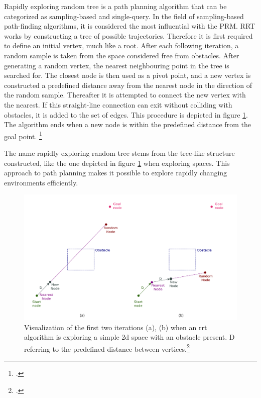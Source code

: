 Rapidly exploring random tree is a path planning algorithm that can be categorized as sampling-based and single-query. In the field of sampling-based path-finding algorithms, it is considered the most influential with the PRM. RRT works by constructing a tree of possible trajectories. Therefore it is first required to define an initial vertex, much like a root. After each following iteration, a random sample is taken from the space considered free from obstacles. After generating a random vertex, the nearest neighbouring point in the tree is searched for. The closest node is then used as a pivot point, and a new vertex is constructed a predefined distance away from the nearest node in the direction of the random sample. Thereafter it is attempted to connect the new vertex with the nearest. If this straight-line connection can exit without colliding with obstacles, it is added to the set of edges. This procedure is depicted in figure \ref{fig:path_planning_rrt}. The algorithm ends when a new node is within the predefined distance from the goal point. 
\footcite{Karaman2011}

The name rapidly exploring random tree stems from the tree-like structure constructed, like the one depicted in figure \ref{fig:path_planning_rrt} when exploring spaces. This approach to path planning makes it possible to explore rapidly changing environments efficiently.


\begin{figure}[h]
	\centering
	\includegraphics[width=0.9\linewidth]{img/rrtIteration}
	\caption{Visualization of the first two iterations (a), (b) when an rrt algorithm is exploring a simple 2d space with an obstacle present. D referring to the predefined distance between vertices.\footcite{Zammit2018}}
	\label{fig:path_planning_rrt}
\end{figure}

